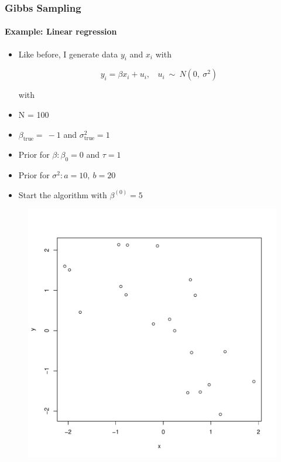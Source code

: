 \documentclass[
  shownotes,
  xcolor={svgnames},
  hyperref={colorlinks,citecolor=DarkBlue,linkcolor=DarkRed,urlcolor=DarkBlue}
  , aspectratio=169]{beamer}
\begin{document}
\begin{frame}[fragile]
\frametitle{Gibbs Sampling} 
\framesubtitle{Example: Linear regression}

\begin{itemize}
\item Like before, I generate data $y_{i}$ and $x_{i}$ with


$$y_{i} = \beta x_{i} + u_{i},\ \ \ \ u_{i}\ \sim\ N(0,\ \sigma^{2})$$

\footnotesize
with
\item N = 100

\item $\beta_{\text{true}} = \  - 1$ and $\sigma_{\text{true}}^{2} = 1$

\item Prior for $\beta:\beta_{0} = 0$ and $\tau = 1$

\item Prior for $\sigma^{2}:a = 10,\ b = 20$
\item Start the algorithm with $\beta^{(0)} = 5$
\end{itemize} 


\begin{figure}[H] \centering
  \centering
  \includegraphics[scale=0.2]{figures/scatter}
  \\
  \tiny 
\end{figure}

   \end{frame}
\end{document}
